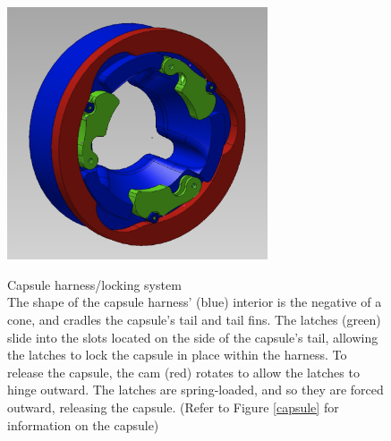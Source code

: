 \documentclass{article}
\begin{document}
\newpage
	\begin{figure}[H]
	\begin{center}
		\includegraphics[width=7.7cm]{HarnessCAD}\\
	\end{center}
		\caption{}
		\label{harness}
Capsule harness/locking system\\ The shape of the capsule harness' (blue) interior is the negative of a cone, and cradles the capsule's tail and tail fins. The latches (green) slide into the slots located on the side of the capsule's tail, allowing the latches to lock the capsule in place within the harness. To release the capsule, the cam (red) rotates to allow the latches to hinge outward. The latches are spring-loaded, and so they are forced outward, releasing the capsule. (Refer to Figure \ref{capsule} for information on the capsule)
	\end{figure}
\end{document}
